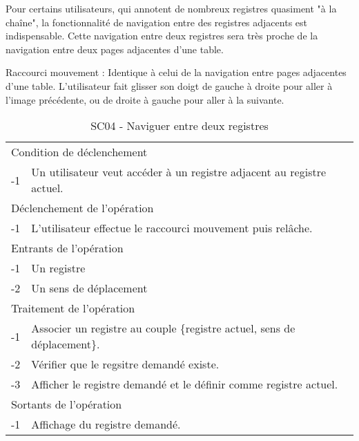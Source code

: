 \documentclass[a4paper]{article}
\begin{document}

Pour certains utilisateurs, qui annotent de nombreux registres quasiment "à la chaîne", la fonctionnalité de navigation entre des registres adjacents est indispensable. Cette navigation entre deux registres sera très proche de la navigation entre deux pages adjacentes d'une table.

Raccourci mouvement : Identique à celui de la navigation entre pages adjacentes d'une table. L'utilisateur fait glisser son doigt de gauche \`a droite pour aller \`a l'image pr\'ec\'edente, ou de droite \`a gauche pour aller \`a la suivante.

\begin{table}[H]
  \centering
   \small
	\begin{tabular}{|c|p{12cm}|}
   		\hline
   			\rowcolor{lightgray}\multicolumn{2}{|c|}{\textbf{SC04 - Naviguer entre deux registres adjacents}} \\
   		\hline
   			\multicolumn{2}{|l|}{Condition de d\'eclenchement} \\
   		\hline
   		-1 & Un utilisateur veut acc\'eder \`a un registre adjacent au registre actuel. \\
   		\hline
   			\multicolumn{2}{|l|}{D\'eclenchement de l'op\'eration} \\
   		\hline
   			-1 & L'utilisateur effectue le raccourci mouvement puis rel\^ache. \\
   		\hline
   			\multicolumn{2}{|l|}{Entrants de l'op\'eration} \\
   		\hline
   			-1 & Un registre \\
        	-2 & Un sens de d\'eplacement \\ 
   		\hline
   			\multicolumn{2}{|l|}{Traitement de l'op\'eration} \\
  		\hline
   			-1 & Associer un registre au couple \{registre actuel, sens de d\'eplacement\}.  \\
        	-2 & V\'erifier que le regsitre demand\'e existe. \\
        	-3 & Afficher le registre demand\'e et le d\'efinir comme registre actuel. \\
   		\hline
   			\multicolumn{2}{|l|}{Sortants de l'op\'eration} \\
   		\hline
   			-1 & Affichage du registre demand\'e. \\
   		\hline
	\end{tabular}
  \caption{SC04 - Naviguer entre deux registres}
  \normalsize
  \label{tab:naviguer_deux_registres_adjacents}
\end{table}
\end{document}
